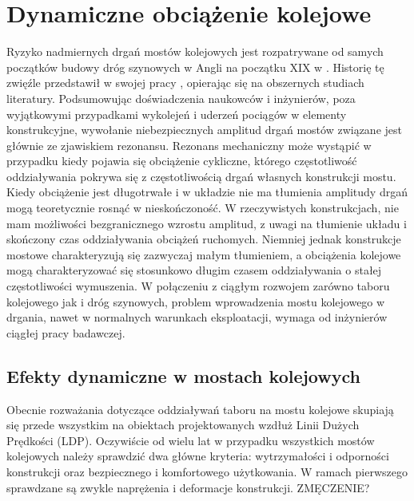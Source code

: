 \section{Dynamiczne obciążenie kolejowe}
Ryzyko nadmiernych drgań mostów kolejowych jest rozpatrywane od samych początków budowy dróg szynowych w Angli na początku XIX w \parencite{Ladislav1996}. Historię tę zwięźle przedstawił w swojej pracy \cite{Szafranski2013}, opierając się na obszernych studiach literatury. Podsumowując doświadczenia naukowców i inżynierów, poza wyjątkowymi przypadkami wykolejeń i uderzeń pociągów w elementy konstrukcyjne, wywołanie niebezpiecznych amplitud drgań mostów związane jest głównie ze zjawiskiem rezonansu. Rezonans mechaniczny może wystąpić w przypadku kiedy pojawia się obciążenie cykliczne, którego częstotliwość oddziaływania pokrywa się z częstotliwością drgań własnych konstrukcji mostu. Kiedy obciążenie jest długotrwałe i w układzie nie ma tłumienia amplitudy drgań mogą teoretycznie rosnąć w nieskończoność. W rzeczywistych konstrukcjach, nie mam możliwości bezgranicznego wzrostu amplitud, z uwagi na tłumienie układu i skończony czas oddziaływania obciążeń ruchomych. Niemniej jednak konstrukcje mostowe charakteryzują się zazwyczaj małym tłumieniem, a obciążenia kolejowe mogą charakteryzować się stosunkowo długim czasem oddziaływania o stałej częstotliwości wymuszenia. W połączeniu z ciągłym rozwojem zarówno taboru kolejowego jak i dróg szynowych, problem wprowadzenia mostu kolejowego w drgania, nawet w normalnych warunkach eksploatacji, wymaga od inżynierów ciągłej pracy badawczej.

\subsection{Efekty dynamiczne w mostach kolejowych}
Obecnie rozważania dotyczące oddziaływań taboru na mostu kolejowe skupiają się przede wszystkim na obiektach projektowanych wzdłuż Linii Dużych Prędkości (LDP). Oczywiście od wielu lat w przypadku wszystkich mostów kolejowych należy sprawdzić dwa główne kryteria: wytrzymałości i odporności konstrukcji oraz bezpiecznego i komfortowego użytkowania. W ramach pierwszego sprawdzane są zwykle naprężenia i deformacje konstrukcji. ZMĘCZENIE? \parencite{Ladislav2008}


